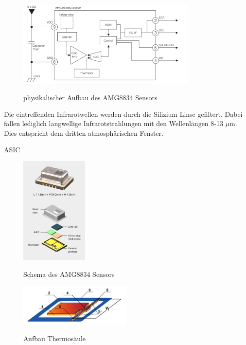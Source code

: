 \begin{figure}[H]
	\centering
	\includegraphics[width=0.8\textwidth]
	{fig/Circuit_AMG8834.PNG}
	\caption[physikalischer Aufbau AMG8834 Sensors]{physikalischer Aufbau des AMG8834 Sensors} \protect\cite{AMG8834}
	\label{fig:physAufbauAMG8834}
\end{figure}

Die eintreffenden Infrarotwellen werden durch die Silizium Linse gefiltert. Dabei fallen lediglich langwellige  Infrarotstrahlungen mit den Wellenlängen 8-13 $\mu$m. Dies entspricht dem dritten atmosphärischen Fenster.


\ac{ASIC}

\begin{figure}[H]
	\centering
	\includegraphics[width=0.3\textwidth]
	{fig/grid_eye_aufbau.PNG}
	\caption[Schema des AMG8834 Sensors]{Schema des AMG8834 Sensors} \protect\cite{AMG8834}
	\label{fig:Explosionsdarstellung}
\end{figure}



\begin{figure}[H]
	\centering
	\includegraphics[width=0.5\textwidth]
	{fig/Mems_Thermopile.PNG}
	\caption[Aufbau Thermosäule]{Aufbau Thermosäule} \protect\cite{AMG8834}
	\label{fig:AufbauThermo}
\end{figure}



